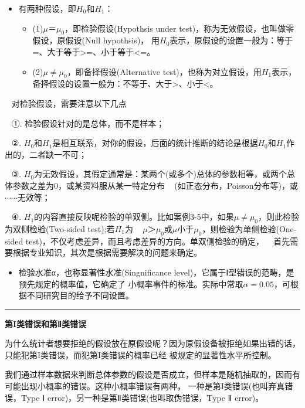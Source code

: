 \documentclass[
]{article}
\providecommand{\tightlist}{%
  \setlength{\itemsep}{0pt}\setlength{\parskip}{0pt}}
\begin{document}
\begin{itemize}
\item
  有两种假设，即\(H_0\)和\(H_1\)：

  \begin{itemize}
  \item
    (1)\(μ＝μ_0\)，即检验假设(Hypothsis under test)，称为无效假设，也叫做零假设，原假设(Null hypothsis)，
    用\(H_0\)表示，原假设的设置一般为：等于=、大于等于\textgreater=、小于等于\textless=。
  \item
    (2)\(μ≠μ_0\)，即备择假设(Alternative test)，也称为对立假设，用\(H_1\)表示，备择假设的设置一般为：不等于、大于\textgreater、小于\textless。
  \end{itemize}
\end{itemize}

~ 对检验假设，需要注意以下几点

~ ①. 检验假设针对的是总体，而不是样本；

~ ②. \(H_0\)和\(H_1\)是相互联系，对你的假设，后面的统计推断的结论是根据\(H_0\)和\(H_1\)作出的，二者缺一不可；

~ ③. \(H_0\)为无效假设，其假定通常是：某两个(或多个)总体的参数相等，或两个总体参数之差为0，或某资料服从某一特定分布
~ (如正态分布，Poisson分布等)，或\(\cdots\cdots\)无效等；

~ ④. \(H_1\)的内容直接反映呢检验的单双侧。比如案例3-5中，如果\(μ≠μ_0\)，则此检验为双侧检验(Two-sided test);若\(H_1\)为
~ \(μ＞μ_0\)或\(μ小于μ_0\)，则检验为单侧检验(One-sided test)，不仅考虑差异，而且考虑差异的方向。单双侧检验的确定，
~ 首先需要根据专业知识，其次是根据需要解决的问题来确定。

\begin{itemize}
\tightlist
\item
  检验水准α，也称显著性水准(Singnificance level)，它属于Ⅰ型错误的范畴，是预先规定的概率值，它确定了
  小概率事件的标准。实际中常取\(\alpha=0.05\)，可根据不同研究目的给予不同设置。
\end{itemize}

\begin{center}\rule{0.5\linewidth}{0.5pt}\end{center}

\textbf{第I类错误和第Ⅱ类错误}

为什么统计者想要拒绝的假设放在原假设呢？因为原假设备被拒绝如果出错的话，只能犯第I类错误，而犯第I类错误的概率已经
被规定的显著性水平所控制。

我们通过样本数据来判断总体参数的假设是否成立，但样本是随机抽取的，因而有可能出现小概率的错误。这种小概率错误有两种，
一种是第I类错误(也叫弃真错误，Type Ⅰ error)，另一种是第Ⅱ类错误(也叫取伪错误，Type Ⅱ error)。
\end{document}
